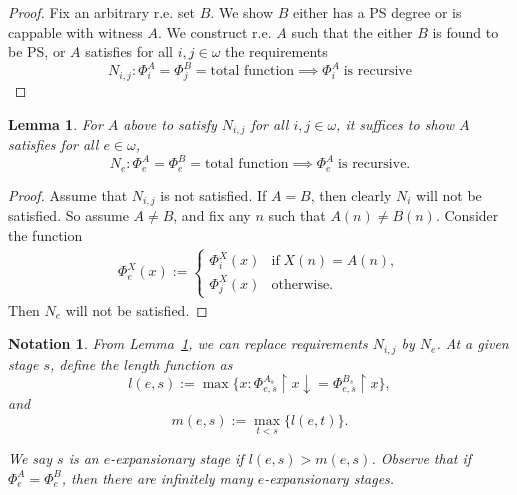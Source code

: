 \documentclass{article}
\newtheorem{notation}{Notation}[subsection]
\newtheorem{lemma}{Lemma}[subsection]
\begin{document}
  \begin{proof}
    Fix an arbitrary r.e. set $B$. We show $B$ either has a PS degree or is
    cappable with witness $A$. We construct r.e. $A$ such that the either
    $B$ is found to be PS, or $A$ satisfies for all $i,j\in\omega$ the
    requirements
    \begin{equation}
      N_{i,j}: \Phi_i^A=\Phi_j^B =\text{total function} \implies
      \Phi_i^A\; \text{is recursive}
      \label{eqn:cappable1}
    \end{equation}
  \end{proof}

  \begin{lemma}
    \label{lemma:N}
    For $A$ above to satisfy $N_{i,j}$ for all
    $i,j\in\omega$, it suffices to show $A$ satisfies for all
    $e\in\omega$,
    \begin{equation}
      N_e: \Phi_e^A=\Phi_e^B =\text{total function} \implies \Phi_e^A\;
      \text{is recursive}.
      \label{eqn:cappable2}
    \end{equation}
  \end{lemma}
  \begin{proof}
    Assume that $N_{i,j}$ is not satisfied. If $A=B$, then
    clearly $N_i$ will not be satisfied. So assume $A\neq B$, and fix any
    $n$ such that $A(n)\neq B(n)$. Consider the function
    \begin{align*}
      \Phi_e^X(x) :=
      \begin{cases}
        \Phi_i^X(x) &\text{if}\; X(n)=A(n),\\
        \Phi_j^X(x) &\text{otherwise}.
      \end{cases}
    \end{align*}
    Then $N_e$ will not be satisfied.
  \end{proof}

  \begin{notation}
    From Lemma~\ref{lemma:N}, we can replace requirements $N_{i,j}$ by
    $N_e$. At a given stage $s$, define the length function as
    \[l(e,s) :=\max\{x: \Phi_{e,s}^{A_s}\restriction x
    \downarrow=\Phi_{e,s}^{B_s}\restriction x\},\]
    and
    \[m(e,s) :=\max_{t<s}\{l(e,t)\}.\]
    
    We say $s$ is an \textit{$e$-expansionary} stage if $l(e,s)>m(e,s)$.
    Observe that if $\Phi^A_e=\Phi^B_e$, then there are infinitely many
    $e$-expansionary stages.\\
  \end{notation}
\end{document}
